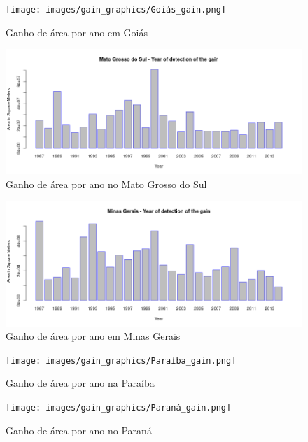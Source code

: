 \begin{figure}[H]
    \centering
    \texttt{[image: images/gain\_graphics/Goiás\_gain.png]}
    \caption{Ganho de área por ano em Goiás}
    \label{fig:gain_goias}
\end{figure}

\begin{figure}[H]
    \centering
    \includegraphics[scale=.5]{images/gain_graphics/Mato Grosso do Sul_gain.png}
    \caption{Ganho de área por ano no Mato Grosso do Sul}
    \label{fig:gain_mato_grosso_sul}
\end{figure}

\begin{figure}[H]
    \centering
    \includegraphics[scale=.5]{images/gain_graphics/Minas Gerais_gain.png}
    \caption{Ganho de área por ano em Minas Gerais}
    \label{fig:gain_minas_gerais}
\end{figure}

\begin{figure}[H]
    \centering
    \texttt{[image: images/gain\_graphics/Paraíba\_gain.png]}
    \caption{Ganho de área por ano na Paraíba}
    \label{fig:gain_paraiba}
\end{figure}

\begin{figure}[H]
    \centering
    \texttt{[image: images/gain\_graphics/Paraná\_gain.png]}
    \caption{Ganho de área por ano no Paraná}
    \label{fig:gain_parana}
\end{figure}

